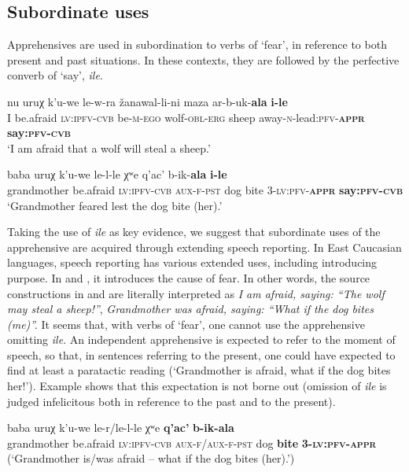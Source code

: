 \documentclass[output=paper,colorlinks,citecolor=brown]{langscibook}
\begin{document}
\subsection{Subordinate uses}
\label{subsec:Msubordinate}
 
Apprehensives are used in subordination to verbs of `fear', in reference to both present  and past  situations. In these contexts, they are followed by the perfective converb of `say', \textit{ile}.


\ea \label{ex:DD41}
\gll nu uruχ k'u-we le-w-ra žanawal-li-ni maza ar-b-uk-\textbf{ala} \textbf{i-le} \\
I be.afraid \textsc{lv:ipfv-cvb} be-\textsc{m-ego} wolf-\textsc{obl-erg} sheep away-\textsc{n}-lead:\textsc{pfv-\textbf{appr}} \textbf{say:\textsc{pfv-cvb}} \\
\glt `I am afraid that a wolf will steal a sheep.'
\z

\ea \label{ex:DD42}
\gll baba uruχ k'u-we le-l-le χʷe {q'ac'} b-ik-\textbf{ala} \textbf{i-le} \\
grandmother be.afraid \textsc{lv:ipfv-cvb} \textsc{aux-f-pst} dog {bite} \textsc{3-lv:pfv-\textbf{appr}} \textbf{say:\textsc{pfv-cvb}} \\
\glt `Grandmother feared lest the dog bite (her).'
\z

 Taking the use of \textit{ile} as key evidence, we suggest that subordinate uses of the apprehensive are acquired through extending speech reporting. In East Caucasian languages, speech reporting has various extended uses, including introducing purpose. In  and , it introduces the cause of fear. In other words, the source constructions in  and  are literally interpreted as \textit{I am afraid, saying: ``The wolf may steal a sheep!''}, \textit{Grandmother was afraid, saying: ``What if the dog bites (me)''.} It seems that, with verbs of `fear', one cannot use the apprehensive omitting \textit{ile}. An independent apprehensive is expected to refer to the moment of speech, so that, in sentences referring to the present, one could have expected to find at least a paratactic reading (`Grandmother is afraid, what if the dog bites her!'). Example  shows that this expectation is not borne out (omission of \textit{ile} is judged infelicitous both in reference to the past and to the present).
 

\ea \label{ex:DD43}
\gll *baba uruχ k'u-we le-r\textup{/}le-l-le χʷe \textbf{q'ac'} \textbf{b-ik-ala} \\
grandmother be.afraid \textsc{lv:ipfv-cvb} \textsc{aux-f}/\textsc{aux-f-pst} dog \textbf{bite} \textbf{\textsc{3-lv:pfv-appr}} \\
\glt (`Grandmother is/was afraid -- what if the dog bites (her).')
\z
\end{document}
